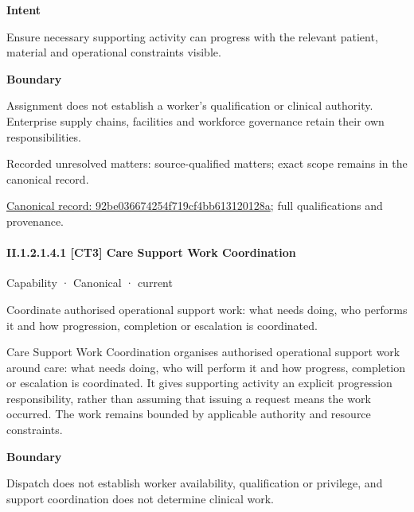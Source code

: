 \textbf{Intent}



Ensure necessary supporting activity can progress with the relevant patient, material and operational constraints visible.



\textbf{Boundary}



Assignment does not establish a worker's qualification or clinical authority. Enterprise supply chains, facilities and workforce governance retain their own responsibilities.


{\small Recorded unresolved matters: source-qualified matters; exact scope remains in the canonical record.}\par
{\footnotesize \href{../../../../../../../continuum/strategy/capability/92be036674254f719cf4bb613120128a.md}{Canonical record: 92be036674254f719cf4bb613120128a}; full qualifications and provenance.}\par
\paragraph*{II.1.2.1.4.1 [CT3] Care Support Work Coordination}
\label{navigation:II.1.2.1.4.1}

\label{element:f9f5c69b0f0b472287cd4ac56ccff6f3}
{\small Capability · Canonical · current}\par

Coordinate authorised operational support work: what needs doing, who performs it and how progression, completion or escalation is coordinated.



Care Support Work Coordination organises authorised operational support work around care: what needs doing, who will perform it and how progress, completion or escalation is coordinated. It gives supporting activity an explicit progression responsibility, rather than assuming that issuing a request means the work occurred. The work remains bounded by applicable authority and resource constraints.



\textbf{Boundary}



Dispatch does not establish worker availability, qualification or privilege, and support coordination does not determine clinical work.


